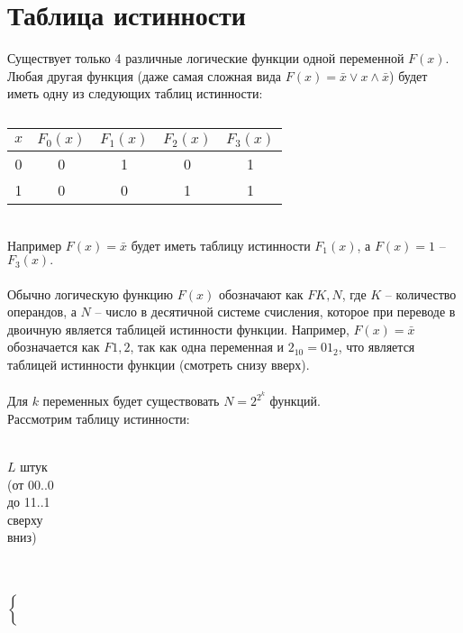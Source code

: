 \section{Таблица истинности}
Существует только 4 различные логические функции одной переменной $F(x)$. Любая другая функция (даже самая сложная вида $F(x) = \bar{x} \vee x \wedge \bar{x}$) будет иметь одну из следующих таблиц истинности:
\begin{table}[!h]
\begin{center} 
\caption{}
\begin{tabular}{|c||c|c|c|c|}
\hline
$x$ & $F_0(x)$ & $F_1(x)$ & $F_2(x)$ & $F_3(x)$ \\
\hline
\hline
0 & 0 & 1 & 0 & 1 \\
\hline
1 & 0 & 0 & 1 & 1 \\
\hline
\end{tabular}
\end{center} 
\end{table}
\\Например $F(x) = \bar{x}$ будет иметь таблицу истинности $F_1(x)$, а $F(x) = 1$ -- $F_3(x).$
\\
\\Обычно логическую функцию $F(x)$ обозначают как $FK,N$, где $K$ -- количество операндов, а $N$ -- число в десятичной системе счисления, которое при переводе в двоичную является таблицей истинности функции. Например, $F(x) = \bar{x}$ обозначается как $F1,2$, так как одна переменная и $2_{10} = 01_{2}$, что является таблицей истинности функции (смотреть снизу вверх).
\\
\\Для $k$ переменных будет существовать $N = 2^{2^{k}}$ функций.
\\Рассмотрим таблицу истинности:
\\
\\
\begin{minipage}{2cm}
\begin{center}
$L$ штук\\
(от 00..0\\ до 11..1 \\ сверху \\ вниз)
\end{center}
\end{minipage}
\begin{minipage}{0.3cm}
\quad \\
\quad \\
$\left\{
\begin{array}{c}
\\
\\
\\
\\
\end{array}
\right.$
\quad \\
\end{minipage}
